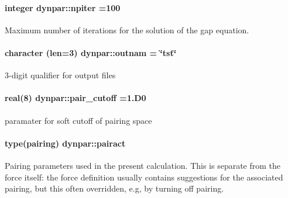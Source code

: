 \paragraph[{\texorpdfstring{npiter}{npiter}}]{\setlength{\rightskip}{0pt plus 5cm}integer dynpar\+::npiter =100}\hypertarget{namespacedynpar_aff25205e0d3d27dd13d9018690705300}{}\label{namespacedynpar_aff25205e0d3d27dd13d9018690705300}


Maximum number of iterations for the solution of the gap equation. 

\paragraph[{\texorpdfstring{outnam}{outnam}}]{\setlength{\rightskip}{0pt plus 5cm}character (len=3) dynpar\+::outnam = \char`\"{}tst\char`\"{}}\hypertarget{namespacedynpar_ae8814a4465f746260e5df076c821cc2c}{}\label{namespacedynpar_ae8814a4465f746260e5df076c821cc2c}


3-\/digit qualifier for output files 

\paragraph[{\texorpdfstring{pair\+\_\+cutoff}{pair_cutoff}}]{\setlength{\rightskip}{0pt plus 5cm}real(8) dynpar\+::pair\+\_\+cutoff =1.\+D0}\hypertarget{namespacedynpar_a9c3f1f575ac40a6f77dc8fe0b25b7de9}{}\label{namespacedynpar_a9c3f1f575ac40a6f77dc8fe0b25b7de9}


paramater for soft cutoff of pairing space 

\paragraph[{\texorpdfstring{pairact}{pairact}}]{\setlength{\rightskip}{0pt plus 5cm}type({\bf pairing}) dynpar\+::pairact}\hypertarget{namespacedynpar_a924d3279ad523c4e4ce6db488f53b781}{}\label{namespacedynpar_a924d3279ad523c4e4ce6db488f53b781}


Pairing parameters used in the present calculation. This is separate from the force itself\+: the force definition usually contains suggestions for the associated pairing, but this often overridden, e.\+g, by turning off pairing. 

